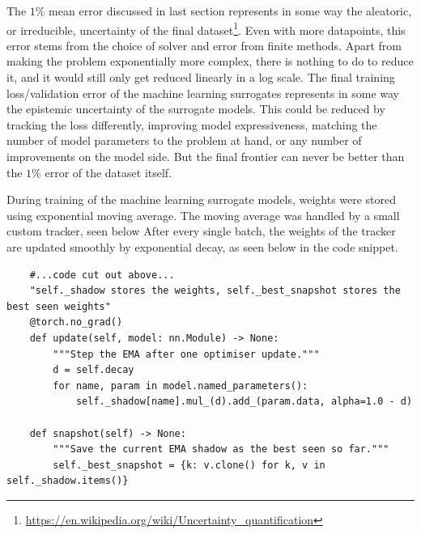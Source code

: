 The $1\%$ mean error discussed in last section represents in some way the aleatoric, or irreducible, uncertainty of the final dataset\footnote{\url{https://en.wikipedia.org/wiki/Uncertainty_quantification}}. Even with more datapoints, this error stems from the choice of solver and error from finite methods. Apart from making the problem exponentially more complex, there is nothing to do to reduce it, and it would still only get reduced linearly in a log scale.
The final training loss/validation error of the machine learning surrogates represents in some way the epistemic uncertainty  of the surrogate models. This could be reduced by tracking the loss differently, improving model expressiveness, matching the number of model parameters to the problem at hand, or any number of improvements on the model side. But the final frontier can never be better than the $1\%$ error of the dataset itself.

During training of the machine learning surrogate models, weights were stored using exponential moving average. The moving average was handled by a small custom tracker, seen below
After every single batch, the weights of the tracker are updated smoothly by exponential decay, as seen below in the code snippet.
\begin{lstlisting}
    #...code cut out above...
    "self._shadow stores the weights, self._best_snapshot stores the best seen weights"
    @torch.no_grad()
    def update(self, model: nn.Module) -> None:
        """Step the EMA after one optimiser update."""
        d = self.decay
        for name, param in model.named_parameters():
            self._shadow[name].mul_(d).add_(param.data, alpha=1.0 - d)

    def snapshot(self) -> None:
        """Save the current EMA shadow as the best seen so far."""
        self._best_snapshot = {k: v.clone() for k, v in self._shadow.items()}
\end{lstlisting}

